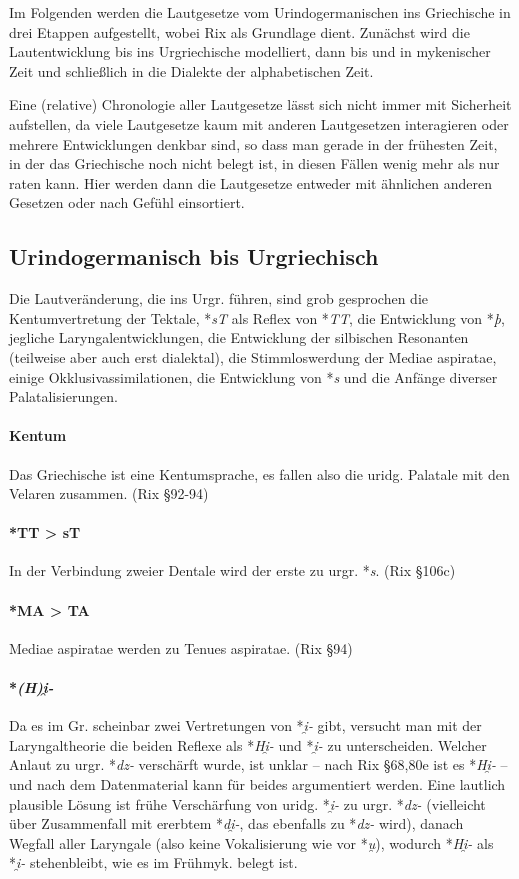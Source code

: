 \documentclass[12pt,a4paper,normalheadings]{scrartcl}
\def\rek#1{*\textit{#1}}
\begin{document}
Im Folgenden werden die Lautgesetze vom Urindogermanischen ins Griechische
in drei Etappen aufgestellt, wobei Rix als Grundlage dient.
Zunächst wird die Lautentwicklung bis ins Urgriechische modelliert,
dann bis und in mykenischer Zeit und schließlich in die Dialekte
der alphabetischen Zeit.

Eine (relative) Chronologie aller Lautgesetze lässt sich nicht immer
mit Sicherheit aufstellen,
da viele Lautgesetze kaum mit anderen Lautgesetzen interagieren
oder mehrere Entwicklungen denkbar sind,
so dass man gerade in der frühesten Zeit,
in der das Griechische noch nicht belegt ist,
in diesen Fällen wenig mehr als nur raten kann.
Hier werden dann die Lautgesetze entweder mit ähnlichen
anderen Gesetzen oder nach Gefühl einsortiert.

\subsection{Urindogermanisch bis Urgriechisch}

Die Lautveränderung,
die ins Urgr. führen, sind grob gesprochen
die Kentumvertretung der Tektale,
\rek{sT} als Reflex von \rek{TT},
die Entwicklung von \rek{þ},
jegliche Laryngalentwicklungen,
die Entwicklung der silbischen Resonanten (teilweise aber auch erst dialektal),
die Stimmloswerdung der Mediae aspiratae,
einige Okklusivassimilationen,
die Entwicklung von \rek{s}
und die Anfänge diverser Palatalisierungen.

\paragraph{Kentum}
Das Griechische ist eine Kentumsprache,
es fallen also die uridg. Palatale mit den Velaren zusammen.
(Rix §92-94)

\paragraph{*TT > sT}
In der Verbindung zweier Dentale wird der erste zu urgr. \rek{s}.
(Rix §106c)

\paragraph{*MA > TA}
Mediae aspiratae werden zu Tenues aspiratae.
(Rix §94)

\paragraph{\rek{(H)i̯-}}
Da es im Gr. scheinbar zwei Vertretungen von \rek{i̯-} gibt,
versucht man mit der Laryngaltheorie die beiden Reflexe als \rek{Hi̯-}
und \rek{i̯-} zu unterscheiden.
Welcher Anlaut zu urgr. \rek{dz-} verschärft wurde,
ist unklar -- nach Rix §68,80e ist es \rek{Hi̯-} --
und nach dem Datenmaterial kann für beides argumentiert werden.
Eine lautlich plausible Lösung ist
frühe Verschärfung von uridg. \rek{i̯-} zu urgr. \rek{dz-}
(vielleicht über Zusammenfall mit ererbtem \rek{di̯-},
das ebenfalls zu \rek{dz-} wird),
danach Wegfall aller Laryngale (also keine Vokalisierung wie vor \rek{u̯}),
wodurch \rek{Hi̯-} als \rek{i̯-} stehenbleibt,
wie es im Frühmyk. belegt ist.
\end{document}
